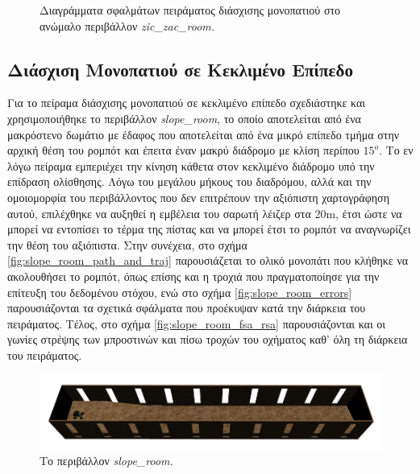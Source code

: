 \begin{figure}[!ht]
	\caption{Διαγράμματα σφαλμάτων πειράματος διάσχισης μονοπατιού στο ανώμαλο περιβάλλον \textit{zic{\_}zac{\_}room.}}
	\label{fig:zic_zac_room_errors}
\end{figure}

\FloatBarrier

\subsection{Διάσχιση Μονοπατιού σε Κεκλιμένο Επίπεδο}
Για το πείραμα διάσχισης μονοπατιού σε κεκλιμένο επίπεδο σχεδιάστηκε και χρησιμοποιήθηκε το περιβάλλον \textit{slope{\_}room}, το οποίο αποτελείται από ένα μακρόστενο δωμάτιο με έδαφος που αποτελείται από ένα μικρό επίπεδο τμήμα στην αρχική θέση του ρομπότ και έπειτα έναν μακρύ διάδρομο με κλίση περίπου $15^o$. Το εν λόγω πείραμα εμπεριέχει την κίνηση κάθετα στον κεκλιμένο διάδρομο υπό την επίδραση ολίσθησης. Λόγω του μεγάλου μήκους του διαδρόμου, αλλά και την ομοιομορφία του περιβάλλοντος που δεν επιτρέπουν την αξιόπιστη χαρτογράφηση αυτού, επιλέχθηκε να αυξηθεί η εμβέλεια του σαρωτή λέιζερ στα 20m, έτσι ώστε να μπορεί να εντοπίσει το τέρμα της πίστας και να μπορεί έτσι το ρομπότ να αναγνωρίζει την θέση του αξιόπιστα. Στην συνέχεια, στο σχήμα \ref{fig:slope_room_path_and_traj} παρουσιάζεται το ολικό μονοπάτι που κλήθηκε να ακολουθήσει το ρομπότ, όπως επίσης και η τροχιά που πραγματοποίησε για την επίτευξη του δεδομένου στόχου, ενώ στο σχήμα \ref{fig:slope_room_errors} παρουσιάζονται τα σχετικά σφάλματα που προέκυψαν κατά την διάρκεια του πειράματος. Τέλος, στο σχήμα \ref{fig:slope_room_fsa_rsa} παρουσιάζονται και οι γωνίες στρέψης των μπροστινών και πίσω τροχών του οχήματος καθ' όλη τη διάρκεια του πειράματος.

\begin{figure}[!ht]
	\centering
	\includegraphics[width=\linewidth]{Chapters/Chapter5/Figures/ptc_experiments/slope_room.png}
	\caption{Το περιβάλλον \textit{slope{\_}room.}}
	\label{fig:slope_room}
\end{figure}	
	
